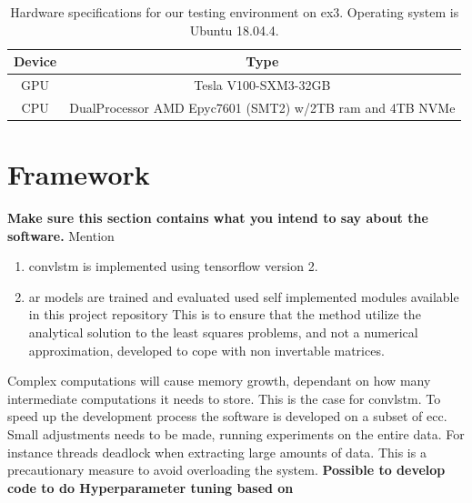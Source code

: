 \begin{table}[ht]
    \centering
    \begin{tabular}{c|c}
        Device &  Type  \\ \hline
        GPU & Tesla V100-SXM3-32GB \\
        CPU & DualProcessor AMD Epyc7601 (SMT2) w/2TB ram and 4TB NVMe 
    \end{tabular}
    \caption{Hardware specifications for our testing environment on \acrshort{ex3}. Operating system is Ubuntu 18.04.4.}
    \label{tab:hardware_ex3}
\end{table}

\section{Framework} \label{sec:framework}
\textbf{Make sure this section contains what you intend to say about the software.}
Mention 
\begin{enumerate}
    \item convlstm is implemented using tensorflow version 2.
    \item ar models are trained and evaluated used self implemented modules available in this project repository 
    This is to ensure that the method utilize the analytical solution to the least squares problems, and not a numerical approximation, developed to cope with non invertable matrices.
\end{enumerate}


Complex computations will cause memory growth, dependant on how many intermediate computations it needs to store. This is the case for \acrshort{convlstm}. To speed up the development process the software is developed on a subset of \acrshort{ecc}. Small adjustments needs to be made, running experiments on the entire data. For instance threads deadlock when extracting large amounts of data. This is a precautionary measure to avoid overloading the system. \textbf{Possible to develop code to do Hyperparameter tuning based on }

